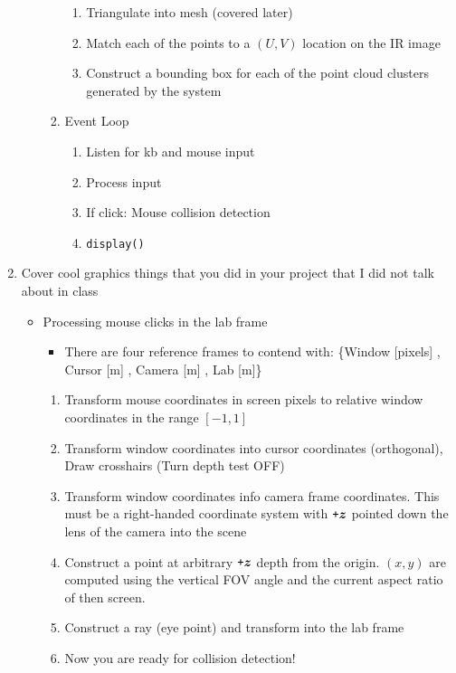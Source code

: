 \documentclass{hw_grad}
\begin{document}
\begin{enumerate}
\begin{enumerate}
\begin{enumerate}
\begin{enumerate}
					\item Triangulate into mesh (covered later)
					\item Match each of the points to a $\left( U,V \right)$ location on the IR image
					\item Construct a bounding box for each of the point cloud clusters generated by the system
				\end{enumerate}
				\item Event Loop
				\begin{enumerate}
					\item Listen for kb and mouse input
					\item Process input
					\item If click: Mouse collision detection
					\item {\tt display()}
				\end{enumerate}
			\end{enumerate}
		\end{enumerate}
		
		\item Cover cool graphics things that you did in your project that I did not talk about in class
		
		\begin{itemize}
			
			\item Processing mouse clicks in the lab frame
			\begin{itemize}
				\item There are four reference frames to contend with: \{Window [pixels] , Cursor [m] , Camera [m] , Lab [m]\}
			\end{itemize}
			\begin{enumerate}
				\item Transform mouse coordinates in screen pixels to relative window coordinates in the range $\left[ -1 , 1 \right]$
				\item Transform window coordinates into cursor coordinates (orthogonal), Draw crosshairs (Turn depth test OFF)
				\item Transform window coordinates info camera frame coordinates.  This must be a right-handed coordinate system with $ \texttt{+} \hbox{\boldmath$z$} $ pointed down the lens of the camera into the scene
				\item Construct a point at arbitrary $ \texttt{+} \hbox{\boldmath$z$} $ depth from the origin. $\left(x,y\right)$ are computed using the vertical FOV angle and the current aspect ratio of then screen.
				\item Construct a ray (eye \rarw point) and transform into the lab frame
				\item Now you are ready for collision detection!
			\end{enumerate}
			

\end{itemize}
\end{enumerate}
\end{document}
